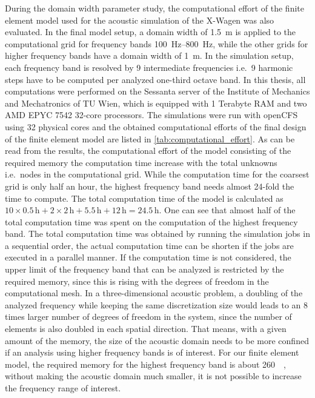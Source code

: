 {During the domain width parameter study, the computational effort of the finite element model used for the acoustic simulation of the X-Wagen was also evaluated. In the final model setup, a domain width of \SI{1.5}{\meter} is applied to the computational grid for frequency bands \SIrange{100}{800}{\hertz}, while the other grids for higher frequency bands have a domain width of \SI{1}{\meter}. In the simulation setup, each frequency band is resolved by 9 intermediate frequencies i.e.\ 9 harmonic steps have to be computed per analyzed one-third octave band. In this thesis, all computations were performed on the Sessanta server of the Institute of Mechanics and Mechatronics of TU Wien, which is equipped with 1 Terabyte RAM and two AMD EPYC 7542 32-core processors. The simulations were run with openCFS using 32 physical cores and the obtained computational efforts of the final design of the finite element model are listed in \cref{tab:computational_effort}. As can be read from the results, the computational effort of the model consisting of the required memory the computation time increase with the total unknowns i.e.\ nodes in the computational grid. While the computation time for the coarsest grid is only half an hour, the highest frequency band needs almost 24-fold the time to compute. The total computation time of the model is calculated as $10\times 0.5\,\text{h} + 2\times 2\,\text{h} + 5.5\,\text{h} + 12\,\text{h} = 24.5\,\text{h}$. One can see that almost half of the total computation time was spent on the computation of the highest frequency band. The total computation time was obtained by running the simulation jobs in a sequential order, the actual computation time can be shorten if the jobs are executed in a parallel manner. If the computation time is not considered, the upper limit of the frequency band that can be analyzed is restricted by the required memory, since this is rising with the degrees of freedom in the computational mesh. In a three-dimensional acoustic problem, a doubling of the analyzed frequency while keeping the same discretization size would leads to an 8 times larger number of degrees of freedom in the system, since the number of elements is also doubled in each spatial direction. That means, with a given amount of the memory, the size of the acoustic domain needs to be more confined if an analysis using higher frequency bands is of interest. For our finite element model, the required memory for the highest frequency band is about \SI{260}{\giga\byte}, without making the acoustic domain much smaller, it is not possible to increase the frequency range of interest.

}
